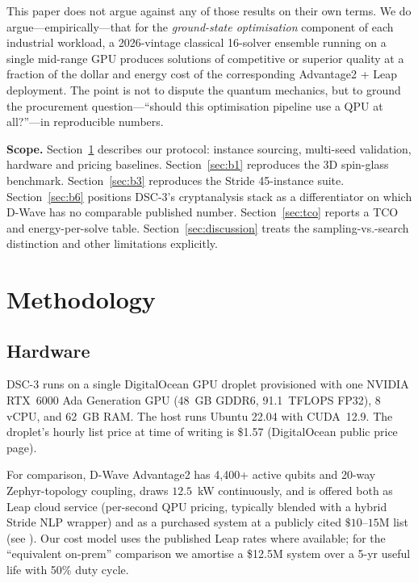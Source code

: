 \documentclass[11pt,a4paper]{article}
\begin{document}
This paper does not argue against any of those results on their own terms.
We do argue---empirically---that for the \emph{ground-state optimisation}
component of each industrial workload, a 2026-vintage classical 16-solver
ensemble running on a single mid-range GPU produces solutions of competitive
or superior quality at a fraction of the dollar and energy cost of the
corresponding Advantage2 + Leap deployment. The point is not to dispute the
quantum mechanics, but to ground the procurement question---``should this
optimisation pipeline use a QPU at all?''---in reproducible numbers.

\medskip
\noindent\textbf{Scope.}
Section~\ref{sec:methodology} describes our protocol: instance sourcing,
multi-seed validation, hardware and pricing baselines.
Section~\ref{sec:b1} reproduces the 3D spin-glass benchmark.
Section~\ref{sec:b3} reproduces the Stride 45-instance suite.
Section~\ref{sec:b6} positions DSC-3's cryptanalysis stack as a
differentiator on which D-Wave has no comparable published number.
Section~\ref{sec:tco} reports a TCO and energy-per-solve table.
Section~\ref{sec:discussion} treats the sampling-vs.-search distinction
and other limitations explicitly.

\section{Methodology}
\label{sec:methodology}

\subsection{Hardware}

DSC-3 runs on a single DigitalOcean GPU droplet provisioned with one NVIDIA
RTX~6000 Ada Generation GPU (48~GB GDDR6, 91.1~TFLOPS FP32), 8 vCPU, and 62~GB
RAM. The host runs Ubuntu 22.04 with CUDA~12.9. The droplet's hourly list
price at time of writing is \$1.57 (DigitalOcean public price page).

For comparison, D-Wave Advantage2 has 4{,}400+ active qubits and 20-way
Zephyr-topology coupling, draws $12.5$~kW continuously, and is offered both
as Leap cloud service (per-second QPU pricing, typically blended with a
hybrid Stride NLP wrapper) and as a purchased system at a publicly cited
$\$10$--$15$M list (see \cite{dwave_q4_2025_results}). Our cost model uses
the published Leap rates where available; for the
``equivalent on-prem'' comparison we amortise a \$12.5M system over a 5-yr
useful life with 50\% duty cycle.
\end{document}
